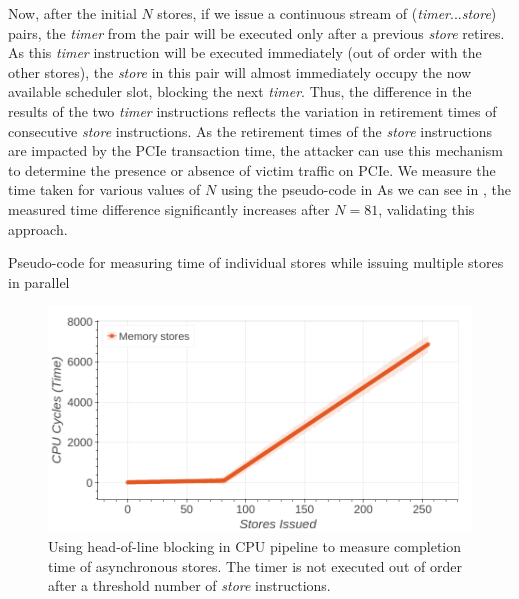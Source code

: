 Now, after the initial $N$ stores, if we issue a continuous stream of (\textit{timer}...\textit{store}) pairs, the \textit{timer} from the pair will be executed only after a previous \textit{store} retires.
As this \textit{timer} instruction will be executed immediately (out of order with the other stores), the \textit{store} in this pair will almost immediately occupy the now available scheduler slot, blocking the next \textit{timer}.
Thus, the difference in the results of the two \textit{timer} instructions reflects the variation in retirement times of consecutive \textit{store} instructions.
As the retirement times of the \textit{store} instructions are impacted by the PCIe transaction time, the attacker can use this mechanism to determine the presence or absence of victim traffic on PCIe.
We measure the time taken for various values of $N$ using the pseudo-code in 
As we can see in , the measured time difference significantly increases after $N = 81$, validating this approach.



\begin{minipage}{\textwidth}

\captionsetup{type=lstlisting}
\caption{Pseudo-code for measuring time of individual stores while issuing multiple stores in parallel}
\label{lst:measuring-time}
\end{minipage}

\begin{figure}[!htb]
    \centering
    \includegraphics[width=\columnwidth]{figures/interconnect-sc/store-ops/measuring_store_time.png}
    \caption{Using head-of-line blocking in CPU pipeline to measure completion time of asynchronous stores.
    The timer is not executed out of order after a threshold number of \textit{store} instructions.}
    \label{fig:measuring-store-time}
\end{figure}

